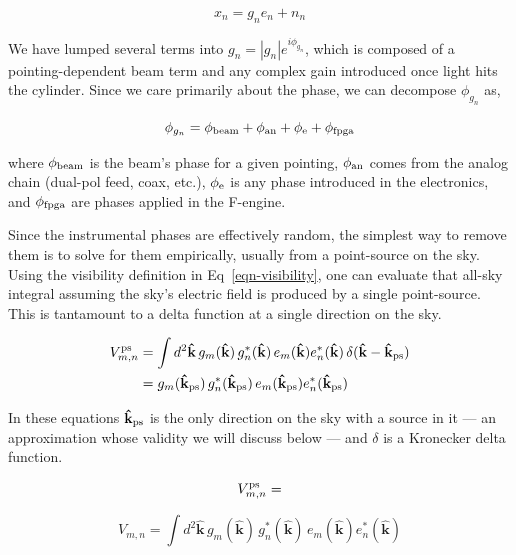 \begin{equation}
     x_n = g_n e_n + n_n
\end{equation}

\noindent We have lumped several terms into $g_n = |g_n| e^{i \phi_{g_n}}$, 
which is composed of a pointing-dependent beam term
and any complex gain introduced once light hits the cylinder. 
Since we care primarily about the phase, we can decompose $\phi_{g_n}$
as,

\begin{equation}
\phi_{g_n} = \phi_{\rm beam} + \phi_{\rm an} + \phi_{\rm e} + \phi_{\rm fpga} 
\end{equation}

\noindent where $\phi_{\rm beam}$ is the beam's phase for a given pointing, 
$\phi_{\rm an}$ comes from the analog chain (dual-pol feed, coax, etc.),  
$\phi_{\rm e}$ is any phase introduced in the electronics, 
and $\phi_{\rm fpga}$ are phases applied in the F-engine. 

Since the instrumental phases are effectively random, the simplest 
way to remove them is to solve for them empirically, usually from 
a point-source on the sky. Using the visibility definition in 
Eq~\ref{eqn-visibility}, one can evaluate that all-sky integral 
assuming the sky's electric field is produced by a single point-source. 
This is tantamount to a delta function at a single direction on the sky.

\begin{align}
\label{eqn-vis_delta}
V^{\rm ps}_{m,n} &= \int d^2\mathbf{\hat{k}} \, g_m(\mathbf{\hat{k}}) \, g^*_n(\mathbf{\hat{k}})\, e_m(\mathbf{\hat{k}}) e_n^*(\mathbf{\hat{k}})\, \delta(\mathbf{\hat{k}} - \mathbf{\hat{k}}_{\rm ps})\\
 &= {g}_m(\mathbf{\hat{k}}_{\rm ps}) \, g^*_n(\mathbf{\hat{k}}_{\rm ps})\,e_m(\mathbf{\hat{k}}_{\rm ps}) e_n^*(\mathbf{\hat{k}}_{\rm ps})
\end{align}

\noindent In these equations $\mathbf{\hat{k}}_{\rm ps}$ is the only direction 
on the sky with a source in it --- an approximation whose validity we 
will discuss below --- and $\delta$ is a Kronecker delta function. 

\begin{equation}
V_{m, n}^{\rm ps} = 
\end{equation}

\begin{equation}
\label{eqn-visibility}
     V_{m,n} = \int d^2\mathbf{\hat{k}} \,
     g_m(\mathbf{\hat{k}}) \, g^*_n(\mathbf{\hat{k}})\, e_m(\mathbf{\hat{k}}) e_n^*(\mathbf{\hat{k}})
\end{equation}

